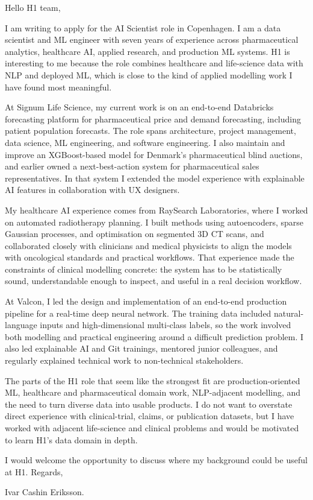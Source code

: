 \documentclass[11pt,a4paper]{moderncv}
\begin{document}
\makecvtitle
Hello H1 team,

\vspace*{2em}
I am writing to apply for the AI Scientist role in Copenhagen. I am a data scientist and ML engineer with seven years of experience across pharmaceutical analytics, healthcare AI, applied research, and production ML systems. H1 is interesting to me because the role combines healthcare and life-science data with NLP and deployed ML, which is close to the kind of applied modelling work I have found most meaningful.

\hspace*{2em}
At Signum Life Science, my current work is on an end-to-end Databricks forecasting platform for pharmaceutical price and demand forecasting, including patient population forecasts. The role spans architecture, project management, data science, ML engineering, and software engineering. I also maintain and improve an XGBoost-based model for Denmark's pharmaceutical blind auctions, and earlier owned a next-best-action system for pharmaceutical sales representatives. In that system I extended the model experience with explainable AI features in collaboration with UX designers.

\hspace*{2em}
My healthcare AI experience comes from RaySearch Laboratories, where I worked on automated radiotherapy planning. I built methods using autoencoders, sparse Gaussian processes, and optimisation on segmented 3D CT scans, and collaborated closely with clinicians and medical physicists to align the models with oncological standards and practical workflows. That experience made the constraints of clinical modelling concrete: the system has to be statistically sound, understandable enough to inspect, and useful in a real decision workflow.

\hspace*{2em}
At Valcon, I led the design and implementation of an end-to-end production pipeline for a real-time deep neural network. The training data included natural-language inputs and high-dimensional multi-class labels, so the work involved both modelling and practical engineering around a difficult prediction problem. I also led explainable AI and Git trainings, mentored junior colleagues, and regularly explained technical work to non-technical stakeholders.

\hspace*{2em}
The parts of the H1 role that seem like the strongest fit are production-oriented ML, healthcare and pharmaceutical domain work, NLP-adjacent modelling, and the need to turn diverse data into usable products. I do not want to overstate direct experience with clinical-trial, claims, or publication datasets, but I have worked with adjacent life-science and clinical problems and would be motivated to learn H1's data domain in depth.

\vspace*{2em}
I would welcome the opportunity to discuss where my background could be useful at H1. Regards,

\vspace*{1em}
Ivar Cashin Eriksson.
\end{document}
